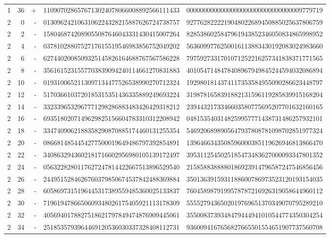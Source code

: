 \begin{longtable}{rrrll}
1 & 36 & + & 1109070286576713024078066008892566111433 & 0000000000000000000000000000000009779719 \\
2 & 0 & - & 0130962421063106224328215887626724738757 & 9277628222219048022689450885025637806759 \\
2 & 2 & - & 1580468742089055087646043331430415007264 & 8285386025847961943852346050834865998952 \\
2 & 4 & - & 0378102880752717615519546983856752049202 & 5636099776250016113883430192083024983660 \\
2 & 6 & - & 6274402008509325145826164688767567586228 & 7975927331701071252216257341838371771565 \\
2 & 8 & - & 3561615231557703839094240114661270831883 & 4010547148478408967949845244594032086894 \\
2 & 10 & - & 0193100652113097134477526538990270712324 & 1929801814374117353584955090286623448797 \\
2 & 12 & - & 5170366103720185315351436335889249693224 & 3198781658391882131596119285839915168204 \\
2 & 14 & - & 3323396532967771298286883483426429318212 & 2394432173346603580775695207701632160165 \\
2 & 16 & - & 6935180207149629825156604783310312208942 & 0481535403148259957771438731486257932101 \\
2 & 18 & - & 3347409062188358290870885174460131255354 & 5469206898905647937808781098702851977324 \\
2 & 20 & - & 0866814854454277500019649486797392854891 & 1396466343508596000385119626946813866470 \\
2 & 22 & - & 3408632943602181716602956980105139172497 & 3953112545025185473483627000093347801352 \\
2 & 24 & - & 0563228280117627247814422667513896529540 & 2158588388880186923914796587247546856456 \\
2 & 26 & - & 2449515284626760379850674537842488369884 & 3501363915931188600786973523120193154035 \\
2 & 28 & - & 6058697315196445317389559485360025133837 & 7604589879199578787216926319058644960112 \\
2 & 30 & - & 7196194786650609348026175405921113178309 & 5555279436502019769651370349070795289210 \\
2 & 32 & - & 4056940178827518621797849474876909445061 & 3550083739348479444941010544774350304254 \\
2 & 34 & - & 2518535793964469120536030337328408112731 & 9360094167656827665501554651907737560708 \\

\end{longtable}

